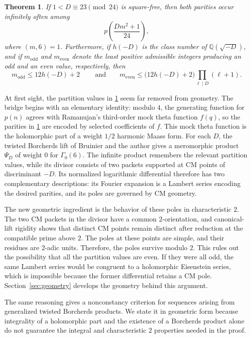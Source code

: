 \documentclass[11pt]{amsart}
\newtheorem{theorem}{Theorem}
\theoremstyle{remark}
\numberwithin{equation}{section}
\newcommand{\Q}{\mathbb Q}
\begin{document}
\begin{theorem}\label{thm:main}
 If $1<D\equiv23\pmod{24}$ is square-free, then both parities occur
 infinitely often among
 \[
  p\!\left(\frac{Dm^2+1}{24}\right),
  \]
  where $(m,6)=1$.
 Furthermore, if $h(-D)$ is the class number of
 $\Q(\sqrt{-D})$, and if $m_{\mathrm{odd}}$ and $m_{\mathrm{even}}$ denote
 the least positive admissible integers producing an odd and an even value,
 respectively, then
 \begin{equation}\label{eq:first-bounds}
   m_{\mathrm{odd}}\leq 12h(-D)+2 \ \qquad {\text {and}}\qquad
   m_{\mathrm{even}} \leq
   \bigl(12h(-D)+2\bigr)\prod_{\ell\mid D}(\ell+1).
 \end{equation}
\end{theorem}

At first sight, the partition values in \cref{thm:main} seem far removed
from geometry.  The bridge begins with an elementary identity: modulo $4$,
the generating function for $p(n)$ agrees with Ramanujan's third-order mock
theta function $f(q)$, so the parities in \cref{thm:main} are encoded by
selected coefficients of $f$.  This mock theta function is the holomorphic
part of a weight $1/2$ harmonic Maass form.  For each $D$, the twisted Borcherds lift of
Bruinier and the author \cite{BruinierOnoAnnals} gives a
meromorphic product $\Psi_D$ of weight $0$ for $\Gamma_0(6)$.  The infinite
product remembers the relevant partition values, while its divisor consists of two packets
supported at CM points of discriminant $-D$.  Its normalized logarithmic
differential therefore has two complementary descriptions: its Fourier
expansion is a Lambert series encoding the desired parities, and its poles
are governed by CM geometry.

The new geometric ingredient is the behavior of these poles in characteristic $2$.
The two CM packets in the divisor have a common $2$-orientation, and canonical-lift
rigidity shows that distinct CM points remain distinct after reduction at
the compatible prime above $2$.  The poles at these points are simple, and
their residues are $2$-adic units.  Therefore, the poles survive modulo
$2$.  This rules out the
possibility that all the partition values are even.  If they were all odd,
the same Lambert series would be congruent to a holomorphic Eisenstein
series, which is impossible because the former differential retains a CM
pole.  Section~\ref{sec:geometry} develops the geometry behind this argument.

The same reasoning gives a nonconstancy criterion for sequences arising
from generalized twisted Borcherds products.  We state it in geometric form
because integrality of a holomorphic part and the existence of a Borcherds
product alone do not guarantee the integral and characteristic $2$ properties
needed in the proof.
\end{document}
